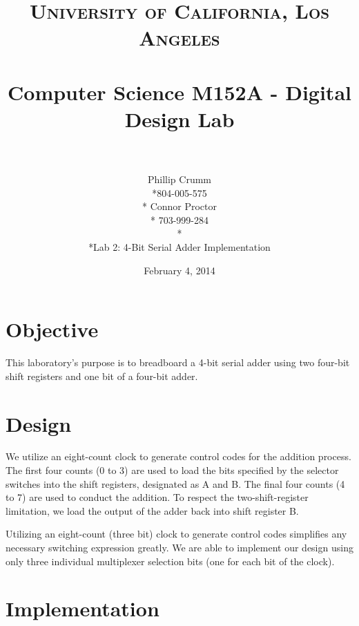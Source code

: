 \documentclass[paper=letter, fontsize=11pt]{scrartcl}
\title{	
\normalfont \normalsize 
\textsc{University of California, Los Angeles} \\ [25pt]
\horrule{0.5pt} \\[0.4cm]
\Large Computer Science M152A - Digital Design Lab \\
\horrule{2pt} \\[0.5cm]
}
\author{Phillip Crumm \\*804-005-575 \\* Connor Proctor \\* 703-999-284 \\* \\*Lab 2: 4-Bit Serial Adder Implementation}
\date{\normalsize February 4, 2014}
\begin{document}
\clearpage\maketitle
\thispagestyle{empty}
\pagebreak


\section{Objective}
This laboratory's purpose is to breadboard a 4-bit serial adder using two four-bit shift registers and one bit of a four-bit adder. 

\section{Design}
We utilize an eight-count clock to generate control codes for the addition process. The first four counts (0 to 3) are used to load the bits specified by the selector switches into the shift registers, designated as A and B. The final four counts (4 to 7) are used to conduct the addition. To respect the two-shift-register limitation, we load the output of the adder back into shift register B.

Utilizing an eight-count (three bit) clock to generate control codes simplifies any necessary switching expression greatly. We are able to implement our design using only three individual multiplexer selection bits (one for each bit of the clock).

\section{Implementation}
\end{document}
